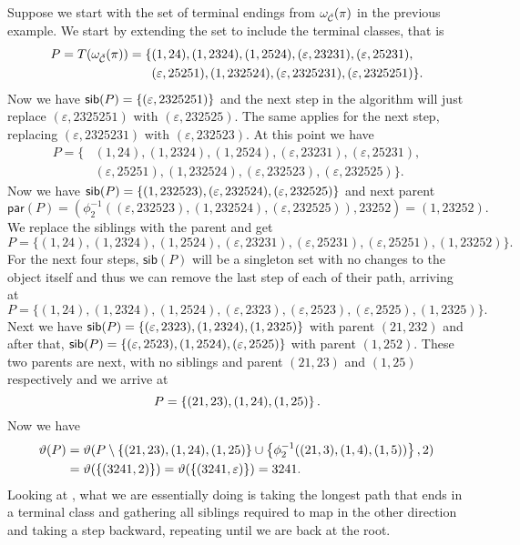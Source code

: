 Suppose we start with the set of terminal endings from $\omega_{\check{\mathcal{C}}}(\pi)$ in the previous example. We start by extending the set to include the terminal classes, that is
\begin{align*}
    P = T(\omega_{\check{\mathcal{C}}}(\pi)) = \{&(1,24), (1,2324), (1,2524), (\varepsilon,23231), (\varepsilon,25231),\\ &(\varepsilon,25251), (1,232524), (\varepsilon,2325231), (\varepsilon,2325251)\}.
\end{align*}
Now we have $\textsf{sib}(P) = \left\{(\varepsilon,2325251)\right\}$ and the next step in the algorithm will just replace $(\varepsilon,2325251)$ with $(\varepsilon,232525)$. The same applies for the next step, replacing $(\varepsilon,2325231)$ with $(\varepsilon,232523)$. At this point we have
\begin{align*}
    P = \{&(1,24), (1,2324), (1,2524), (\varepsilon,23231), (\varepsilon,25231),\\ &(\varepsilon,25251), (1,232524), (\varepsilon,232523), (\varepsilon,232525)\}.
\end{align*}
Now we have $\textsf{sib}(P) = \left\{(1,232523), (\varepsilon,232524), (\varepsilon,232525)\right\}$ and next parent
\[
    \textsf{par}(P) = (\phi_2^{-1}((\varepsilon, 232523),(1, 232524),(\varepsilon, 232525)), 23252) = (1,23252).
\]
We replace the siblings with the parent and get
\[
    P = \{(1,24), (1,2324), (1,2524), (\varepsilon,23231), (\varepsilon,25231),(\varepsilon,25251), (1,23252)\}.
\]
For the next four steps, $\textsf{sib}(P)$ will be a singleton set with no changes to the object itself and thus we can remove the last step of each of their path, arriving at
\[
    P = \{(1,24), (1,2324), (1,2524), (\varepsilon,2323), (\varepsilon,2523),(\varepsilon,2525), (1,2325)\}.
\]
Next we have $\textsf{sib}(P) = \left\{(\varepsilon, 2323), (1, 2324), (1,2325)\right\}$ with parent $(21,232)$ and after that, $\textsf{sib}(P) = \left\{(\varepsilon, 2523), (1, 2524), (\varepsilon,2525)\right\}$ with parent $(1,252)$. These two parents are next, with no siblings and parent $(21,23)$ and $(1,25)$ respectively and we arrive at 
\[
    P = \left\{(21,23),(1,24),(1,25)\right\}.
\]
Now we have
\begin{align*}
    \vartheta(P) &= \vartheta(P \setminus \left\{(21,23),(1,24),(1,25)\right\} \cup \left\{\phi_2^{-1}((21,3),(1,4),(1,5))\right\}, 2)\\
    &= \vartheta(\left\{(3241,2)\right\}) = \vartheta(\left\{(3241,\varepsilon)\right\}) = 3241.
\end{align*}
Looking at , what we are essentially doing is taking the longest path that ends in a terminal class and gathering all siblings required to map in the other direction and taking a step backward, repeating until we are back at the root.

